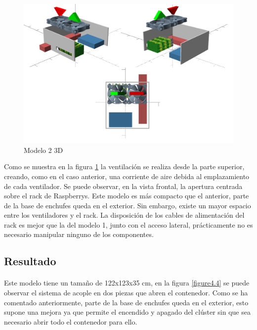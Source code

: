 \begin{figure}[H]
	\centering
  	\includegraphics[width=120mm]{Modelos/M2X.png}
   	\caption[Modelo 2 3D]{Modelo 2 3D}
   \label{figure4.3}
\end{figure}

Como se muestra en la figura \ref{figure4.3} la ventilación se realiza desde la parte superior, creando, como en el caso anterior, una corriente de aire debida al emplazamiento de cada ventilador. Se puede observar, en la vista frontal, la apertura centrada sobre el rack de Raspberrys.
Este modelo es más compacto que el anterior, parte de la base de enchufes queda en el exterior. Sin embargo, existe un mayor espacio entre los ventiladores y el rack.
La disposición de los cables de alimentación del rack es mejor que la del modelo 1, junto con el acceso lateral, prácticamente no es necesario manipular ninguno de los componentes.

\subsection{Resultado}
\paragraph{}

Este modelo tiene un tamaño de 122x123x35 cm, en la figura \ref{figure4.4} se puede observar el sistema de acople en dos piezas que abren el contenedor. Como se ha comentado anteriormente, parte de la base de enchufes queda en el exterior, esto supone una mejora ya que permite el encendido y apagado del clúster sin que sea necesario abrir todo el contenedor para ello. 

